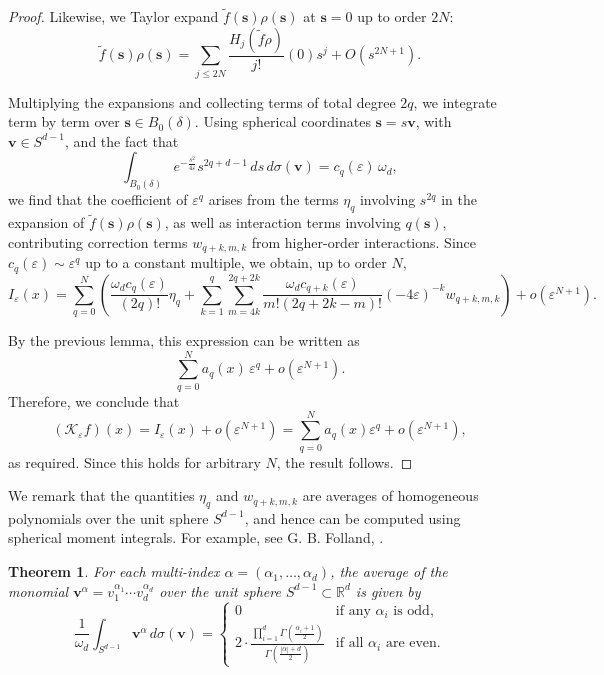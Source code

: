 \documentclass{amsart}
\theoremstyle{Theorem}
\newtheorem{thm}[theorem]{Theorem}
\theoremstyle{remark}
\numberwithin{equation}{section} \numberwithin{figure}{section}
\begin{document}
\begin{proof}
Likewise, we Taylor expand \( \widetilde{f}(\mathbf{s}) \rho(\mathbf{s}) \) at \( \mathbf{s} = 0 \) up to order \( 2N \):
\[
\widetilde{f}(\mathbf{s}) \rho(\mathbf{s}) = \sum_{j \le 2N} \frac{ H_{j}(\widetilde{f} \rho)}{j!}(0)  s^{j} + O(s^{2N+1}).
\]

Multiplying the expansions and collecting terms of total degree \( 2q \), we integrate term by term over \( \mathbf{s} \in B_0(\delta) \). Using spherical coordinates \( \mathbf{s} = s \mathbf{v} \), with \( \mathbf{v} \in S^{d-1} \), and the fact that
\[
\int_{B_0(\delta)} e^{ -\frac{s^2}{4\varepsilon} } s^{2q+d-1} \, ds \, d\sigma(\mathbf{v}) = c_q(\varepsilon)\, \omega_d,
\]
we find that the coefficient of \( \varepsilon^q \) arises from the terms \( \eta_q \) involving \( s^{2q} \) in the expansion of \( \widetilde{f}(\mathbf{s}) \rho(\mathbf{s}) \), as well as interaction terms involving \( q(\mathbf{s}) \), contributing correction terms \( w_{q+k,m,k} \) from higher-order interactions.
Since \( c_q(\varepsilon) \sim \varepsilon^{q} \) up to a constant multiple, we obtain, up to order \( N \),
\[
I_\varepsilon(x) = \sum_{q=0}^{N} \left( \frac{ \omega_d c_q(\varepsilon) }{(2q)!} \eta_q 
+ \sum_{k=1}^{q} \sum_{m=4k}^{2q+2k} \frac{ \omega_d c_{q+k}(\varepsilon) }{ m!(2q+2k - m)! } 
(-4\varepsilon)^{-k} w_{q+k, m, k} \right) + o(\varepsilon^{N+1}).
\]

By the previous lemma, this expression can be written as
\[
\sum_{q=0}^{N} a_q(x)\, \varepsilon^q + o(\varepsilon^{N+1}).
\]
Therefore, we conclude that
\[
(\mathcal{K}_\varepsilon f)(x) = I_\varepsilon(x) + o(\varepsilon^{N+1}) = \sum_{q=0}^{N} a_q(x) \varepsilon^q + o(\varepsilon^{N+1}),
\]
as required. Since this holds for arbitrary \( N \), the result follows.
\end{proof}





We remark that the quantities \( \eta_q \) and \( w_{q+k, m, k} \) are averages of homogeneous polynomials over the unit sphere \( S^{d-1} \), and hence can be computed using spherical moment integrals. For example, see G. B. Folland, \cite{F}.

\begin{thm}
For each multi-index \( \alpha = (\alpha_1, \dots, \alpha_d) \), the average of the monomial \( \mathbf{v}^{\alpha} = v_1^{\alpha_1} \cdots v_d^{\alpha_d} \) over the unit sphere \( S^{d-1} \subset \mathbb{R}^d \) is given by
\[
\frac{1}{\omega_d} \int_{S^{d-1}} \mathbf{v}^{\alpha} \, d\sigma(\mathbf{v}) =
\begin{cases}
0 & \text{if any } \alpha_i \text{ is odd}, \\
\displaystyle 2 \cdot \frac{ \prod_{i=1}^{d} \Gamma\left( \frac{\alpha_i + 1}{2} \right) }{ \Gamma\left( \frac{|\alpha| + d}{2} \right) } & \text{if all } \alpha_i \text{ are even}.
\end{cases}
\]
\end{thm}
\end{document}
